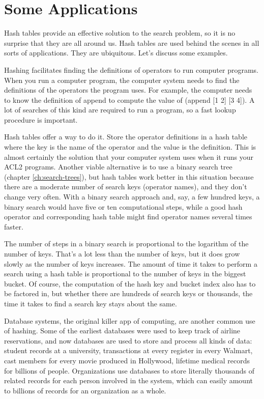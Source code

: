 \section{Some Applications}

Hash tables provide an effective solution to the search problem,
so it is no surprise that they are all around us.
Hash tables are used behind the scenes in all sorts of applications.
They are ubiquitous.
Let's discuss some examples.

Hashing facilitates finding the definitions of operators
to run computer programs.
When you run a computer program,
the computer system needs to find the definitions
of the operators the program uses.
For example, the computer needs to know the definition of
\textsf{append} to compute the value of \textsf{(append [1 2] [3  4])}.
A lot of searches of this kind are required to run a program,
so a fast lookup procedure is important.

Hash tables offer a way to do it. Store the operator
definitions in a hash table where the key is the name of the operator
and the value is the definition. This is almost certainly the solution
that your computer system uses when it runs your ACL2 programs.
Another viable alternative is to use a binary search tree
(chapter \ref{ch:search-trees}), but hash tables work better
in this situation because there are a moderate number of search keys
(operator names), and they don't change very often.
With a binary search approach and, say, a few hundred keys,
a binary search would have five or ten computational steps,
while a good hash operator and corresponding hash table
might find operator names several times faster.

The number of steps in a binary search is proportional to the
logarithm of the number of keys. That's a lot less than the
number of keys, but it does grow slowly as the number of keys increases.
The amount of time it takes to perform a search using a hash table
is proportional to the number of keys in the biggest bucket.
Of course, the computation of the hash key and bucket index
also has to be factored in, but whether there are hundreds of search keys
or thousands, the time it takes to find a search
key stays about the same.

Database systems, the original killer app of
computing, are another common use of hashing.
Some of the earliest databases were used to keep track
of airline reservations, and now databases are used to store and
process all kinds of data: student records at a university,
transactions at every register in every Walmart,
cast members for every movie produced in Hollywood,
lifetime medical records for billions of people.
Organizations use databases to store literally
thousands of related records for each person involved in the system,
which can easily amount to billions
of records for an organization as a whole.

